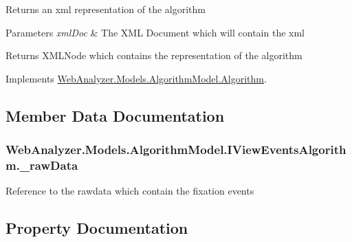 Returns an xml representation of the algorithm 


\begin{DoxyParams}{Parameters}
{\em xml\+Doc} & The X\+M\+L Document which will contain the xml\\
\hline
\end{DoxyParams}
\begin{DoxyReturn}{Returns}
X\+M\+L\+Node which contains the representation of the algorithm
\end{DoxyReturn}


Implements \hyperlink{class_web_analyzer_1_1_models_1_1_algorithm_model_1_1_algorithm_a84b84152621c8e87b7068bcbfeeaa1f9}{Web\+Analyzer.\+Models.\+Algorithm\+Model.\+Algorithm}.



\subsection{Member Data Documentation}
\hypertarget{class_web_analyzer_1_1_models_1_1_algorithm_model_1_1_i_view_events_algorithm_a61794c588714f70bca962727c730b52c}{}
\subsubsection[{\+\_\+raw\+Data}]{ Web\+Analyzer.\+Models.\+Algorithm\+Model.\+I\+View\+Events\+Algorithm.\+\_\+raw\+Data\hspace{0.3cm}{\ttfamily [private]}}\label{class_web_analyzer_1_1_models_1_1_algorithm_model_1_1_i_view_events_algorithm_a61794c588714f70bca962727c730b52c}


Reference to the rawdata which contain the fixation events 



\subsection{Property Documentation}
\hypertarget{class_web_analyzer_1_1_models_1_1_algorithm_model_1_1_i_view_events_algorithm_a1fbc48724f9cc7bea3d6ee03d9d533eb}{}
